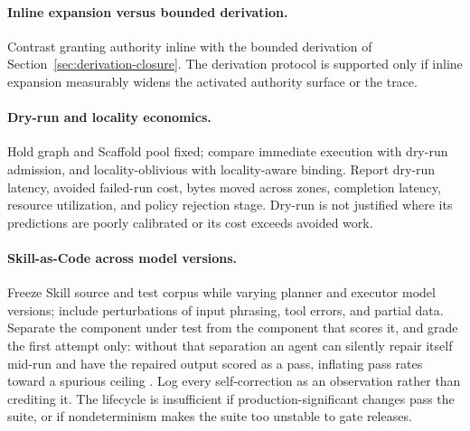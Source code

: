 \documentclass[11pt]{article}
\begin{document}
\paragraph{Inline expansion versus bounded derivation.}
Contrast granting authority inline with the bounded derivation of Section~\ref{sec:derivation-closure}. The derivation protocol is supported only if inline expansion measurably widens the activated authority surface or the trace.

\paragraph{Dry-run and locality economics.}
Hold graph and Scaffold pool fixed; compare immediate execution with dry-run admission, and locality-oblivious with locality-aware binding. Report dry-run latency, avoided failed-run cost, bytes moved across zones, completion latency, resource utilization, and policy rejection stage. Dry-run is not justified where its predictions are poorly calibrated or its cost exceeds avoided work.

\paragraph{Skill-as-Code across model versions.}
Freeze Skill source and test corpus while varying planner and executor model versions; include perturbations of input phrasing, tool errors, and partial data. Separate the component under test from the component that scores it, and grade the first attempt only: without that separation an agent can silently repair itself mid-run and have the repaired output scored as a pass, inflating pass rates toward a spurious ceiling \cite{anand2026aeval}. Log every self-correction as an observation rather than crediting it. The lifecycle is insufficient if production-significant changes pass the suite, or if nondeterminism makes the suite too unstable to gate releases.
\end{document}
